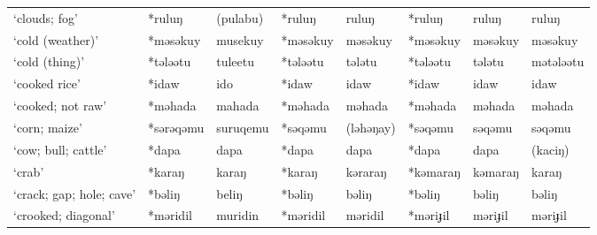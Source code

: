 \begin{landscape}
\begin{longtable}[c]{@{}p{3cm}<{\raggedright}p{2.75cm}<{\raggedright}p{2.75cm}<{\raggedright}p{2.75cm}<{\raggedright}p{2.75cm}<{\raggedright}p{2.75cm}<{\raggedright}p{2.75cm}<{\raggedright}p{2.75cm}<{\raggedright}@{}}
`clouds; fog'                                        & *ruluŋ             & (pulabu)                       & *ruluŋ             & ruluŋ                      & *ruluŋ           & ruluŋ                    & ruluŋ                             \\
`cold (weather)'                                     & *məsəkuy           & musekuy                        & *məsəkuy           & məsəkuy                    & *məsəkuy         & məsəkuy                  & məsəkuy                           \\
`cold (thing)'                                       & *tələətu           & tuleetu                        & *tələətu           & tələtu                     & *tələətu         & tələtu                   & mətələətu                         \\
`cooked rice'                                        & *idaw              & ido                            & *idaw              & idaw                       & *idaw            & idaw                     & idaw                              \\
`cooked; not raw'                                    & *məhada            & mahada                         & *məhada            & məhada                     & *məhada          & məhada                   & məhada                            \\
`corn; maize'                                        & *sərəqəmu          & suruqemu                       & *səqəmu            & (ləhəŋay)                  & *səqəmu          & səqəmu                   & səqəmu                            \\
`cow; bull; cattle'                                  & *dapa              & dapa                           & *dapa              & dapa                       & *dapa            & dapa                     & (kaciŋ)                           \\
`crab'                                               & *karaŋ             & karaŋ                          & *karaŋ             & kəraraŋ                    & *kəmaraŋ         & kəmaraŋ                  & karaŋ                             \\
`crack; gap; hole; cave'                             & *bəliŋ             & beliŋ                          & *bəliŋ             & bəliŋ                      & *bəliŋ           & bəliŋ                    & bəliŋ                             \\
`crooked; diagonal'                                  & *məridil           & muridin                        & *məridil           & məridil                    & *məriɟil         & məriɟil                  & məriɟil                           \\

\end{longtable}
\end{landscape}
